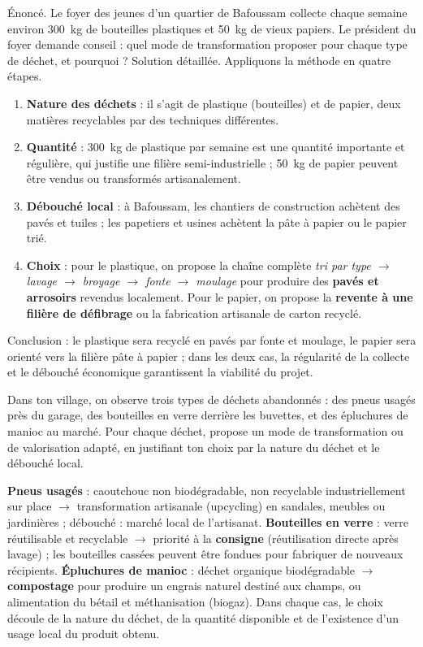 \documentclass[11pt]{article}
\begin{document}
\begin{exoresolu}
Énoncé. Le foyer des jeunes d'un quartier de Bafoussam collecte chaque semaine environ 300~kg de bouteilles plastiques et 50~kg de vieux papiers. Le président du foyer demande conseil : quel mode de transformation proposer pour chaque type de déchet, et pourquoi ?
\tcblower
Solution détaillée. Appliquons la méthode en quatre étapes.
\begin{enumerate}
\item \textbf{Nature des déchets} : il s'agit de plastique (bouteilles) et de papier, deux matières recyclables par des techniques différentes.
\item \textbf{Quantité} : 300~kg de plastique par semaine est une quantité importante et régulière, qui justifie une filière semi-industrielle ; 50~kg de papier peuvent être vendus ou transformés artisanalement.
\item \textbf{Débouché local} : à Bafoussam, les chantiers de construction achètent des pavés et tuiles ; les papetiers et usines achètent la pâte à papier ou le papier trié.
\item \textbf{Choix} : pour le plastique, on propose la chaîne complète \emph{tri par type $\rightarrow$ lavage $\rightarrow$ broyage $\rightarrow$ fonte $\rightarrow$ moulage} pour produire des \textbf{pavés et arrosoirs} revendus localement. Pour le papier, on propose la \textbf{revente à une filière de défibrage} ou la fabrication artisanale de carton recyclé.
\end{enumerate}
Conclusion : le plastique sera recyclé en pavés par fonte et moulage, le papier sera orienté vers la filière pâte à papier ; dans les deux cas, la régularité de la collecte et le débouché économique garantissent la viabilité du projet.
\end{exoresolu}

\begin{exercice}
Dans ton village, on observe trois types de déchets abandonnés : des pneus usagés près du garage, des bouteilles en verre derrière les buvettes, et des épluchures de manioc au marché. Pour chaque déchet, propose un mode de transformation ou de valorisation adapté, en justifiant ton choix par la nature du déchet et le débouché local.
\end{exercice}

\begin{corrige}[Exercice]
\textbf{Pneus usagés} : caoutchouc non biodégradable, non recyclable industriellement sur place $\rightarrow$ transformation artisanale (upcycling) en sandales, meubles ou jardinières ; débouché : marché local de l'artisanat.
\textbf{Bouteilles en verre} : verre réutilisable et recyclable $\rightarrow$ priorité à la \textbf{consigne} (réutilisation directe après lavage) ; les bouteilles cassées peuvent être fondues pour fabriquer de nouveaux récipients.
\textbf{Épluchures de manioc} : déchet organique biodégradable $\rightarrow$ \textbf{compostage} pour produire un engrais naturel destiné aux champs, ou alimentation du bétail et méthanisation (biogaz). Dans chaque cas, le choix découle de la nature du déchet, de la quantité disponible et de l'existence d'un usage local du produit obtenu.
\end{corrige}
\end{document}
